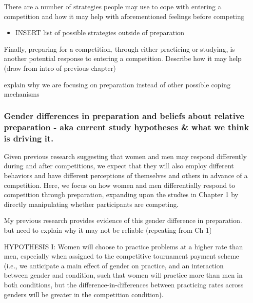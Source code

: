 \documentclass[a4paper, nobind]{templates/ociamthesis}
\providecommand{\tightlist}{%
  \setlength{\itemsep}{0pt}\setlength{\parskip}{0pt}}
\begin{document}
There are a number of strategies people may use to cope with entering a competition and how it may help with aforementioned feelings before competing

\begin{itemize}
\tightlist
\item
  INSERT list of possible strategies outside of preparation
\end{itemize}

Finally, preparing for a competition, through either practicing or studying, is another potential response to entering a competition. Describe how it may help (draw from intro of previous chapter)

explain why we are focusing on preparation instead of other possible coping mechanisms

\hypertarget{gender-differences-in-preparation-and-beliefs-about-relative-preparation---aka-current-study-hypotheses-what-we-think-is-driving-it.}{%
\subsubsection{Gender differences in preparation and beliefs about relative preparation - aka current study hypotheses \& what we think is driving it.}\label{gender-differences-in-preparation-and-beliefs-about-relative-preparation---aka-current-study-hypotheses-what-we-think-is-driving-it.}}

Given previous research suggesting that women and men may respond differently during and after competitions, we expect that they will also employ different behaviors and have different perceptions of themselves and others in advance of a competition.
Here, we focus on how women and men differentially respond to competition through preparation, expanding upon the studies in Chapter 1 by directly manipulating whether participants are competing.

My previous research provides evidence of this gender difference in preparation. but need to explain why it may not be reliable (repeating from Ch 1)

HYPOTHESIS I: Women will choose to practice problems at a higher rate than men, especially when assigned to the competitive tournament payment scheme (i.e., we anticipate a main effect of gender on practice, and an interaction between gender and condition, such that women will practice more than men in both conditions, but the difference-in-differences between practicing rates across genders will be greater in the competition condition).
\end{document}
